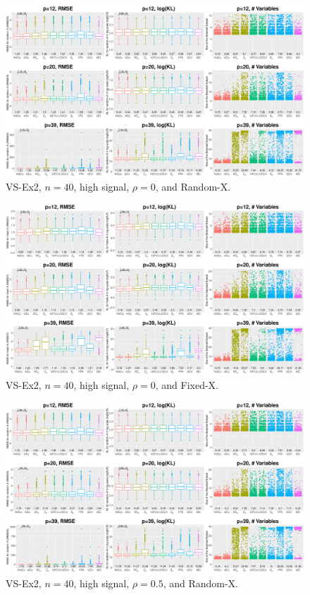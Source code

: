 \clearpage
\begin{figure}[!ht]
\centering
\includegraphics[width=\textwidth]{figures/supplement/randomx_VS-Ex2_n40_hsnr_rho0.eps}
\caption{VS-Ex2, $n=40$, high signal, $\rho=0$, and Random-X.}
\end{figure}
\begin{figure}[!ht]
\centering
\includegraphics[width=\textwidth]{figures/supplement/fixedx_VS-Ex2_n40_hsnr_rho0.eps}
\caption{VS-Ex2, $n=40$, high signal, $\rho=0$, and Fixed-X.}
\end{figure}
\clearpage
\begin{figure}[!ht]
\centering
\includegraphics[width=\textwidth]{figures/supplement/randomx_VS-Ex2_n40_hsnr_rho05.eps}
\caption{VS-Ex2, $n=40$, high signal, $\rho=0.5$, and Random-X.}
\end{figure}
